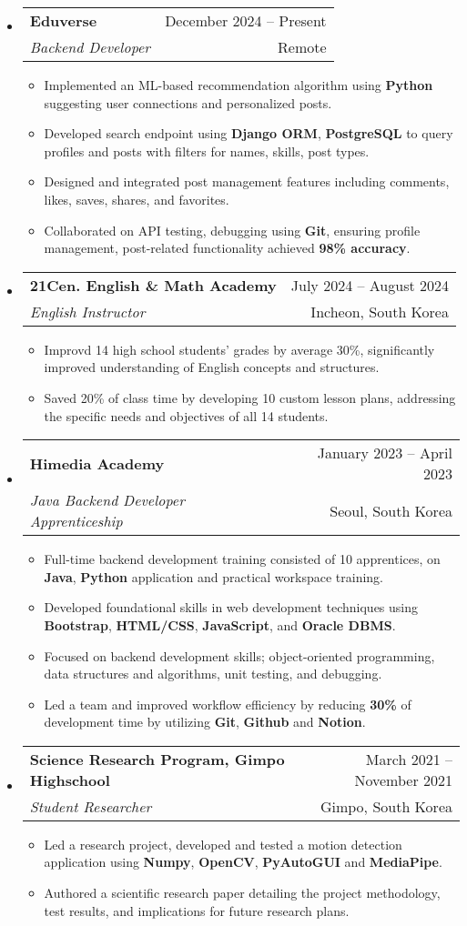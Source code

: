 \documentclass[letterpaper,11pt]{article}
\makeatletter
\newcommand{\resumeItem}[1]{
  \item\small{
    {#1 \vspace{-3pt}}
  }
}
\newcommand{\resumeSubheading}[4]{
    \item
    \begin{tabular*}{0.97\textwidth}[t]{l@{\extracolsep{\fill}}r@{\hspace{-0.2in}}}
        \small{\textbf{#1}} & \small{#2} \\
        \textit{\small#3} & \small #4 \\
    \end{tabular*}\vspace{-5pt}
}
\newcommand{\resumeSubHeadingListStart}{\begin{itemize}[leftmargin=0.00in, rightmargin=-0.2in, label={}]}
\newcommand{\resumeSubHeadingListEnd}{\end{itemize}\vspace{-7pt}}
\newcommand{\resumeItemListStart}{\begin{itemize}[leftmargin=0.15in, rightmargin=0.15in]}
\newcommand{\resumeItemListEnd}{\end{itemize}\vspace{-7pt}}
\makeatother
\begin{document}
\resumeSubHeadingListStart
\resumeSubheading
{Eduverse}{December 2024 -- Present}
{Backend Developer}{Remote}
\resumeItemListStart
\resumeItem{Implemented an ML-based recommendation algorithm using \textbf{Python} suggesting user connections and personalized posts.}
\resumeItem{Developed search endpoint using \textbf{Django ORM}, \textbf{PostgreSQL} to query profiles and posts with filters for names, skills, post types.}
\resumeItem{Designed and integrated post management features including comments, likes, saves, shares, and favorites.}
\resumeItem{Collaborated on API testing, debugging using \textbf{Git}, ensuring profile management, post-related functionality achieved \textbf{98\% accuracy}.}
\resumeItemListEnd
\resumeSubHeadingListEnd

\resumeSubHeadingListStart
\resumeSubheading
{21Cen. English \& Math Academy}{July 2024 -- August 2024}
{English Instructor}{Incheon, South Korea}
\resumeItemListStart
\resumeItem{Improvd 14 high school students' grades by average 30\%, significantly improved understanding of English concepts and structures.}
\resumeItem{Saved 20\% of class time by developing 10 custom lesson plans, addressing the specific needs and objectives of all 14 students.}
\resumeItemListEnd
\resumeSubHeadingListEnd

\resumeSubHeadingListStart
\resumeSubheading
{Himedia Academy}{January 2023 -- April 2023}
{Java Backend Developer Apprenticeship}{Seoul, South Korea}
\resumeItemListStart
\resumeItem{Full-time backend development training consisted of 10 apprentices, on \textbf{Java}, \textbf{Python} application and practical workspace training.}
\resumeItem{Developed foundational skills in web development techniques using \textbf{Bootstrap}, \textbf{HTML/CSS}, \textbf{JavaScript}, and \textbf{Oracle DBMS}.}
\resumeItem{Focused on backend development skills; object-oriented programming, data structures and algorithms, unit testing, and debugging.}
\resumeItem{Led a team and improved workflow efficiency by reducing \textbf{30\%} of development time by utilizing \textbf{Git}, \textbf{Github} and \textbf{Notion}.}
\resumeItemListEnd
\resumeSubHeadingListEnd

\resumeSubHeadingListStart
\resumeSubheading
{Science Research Program, Gimpo Highschool}{March 2021 -- November 2021}
{Student Researcher}{Gimpo, South Korea}
\resumeItemListStart
\resumeItem{Led a research project, developed and tested a motion detection application using \textbf{Numpy}, \textbf{OpenCV}, \textbf{PyAutoGUI} and \textbf{MediaPipe}.}
\resumeItem{Authored a scientific research paper detailing the project methodology, test results, and implications for future research plans.}
\resumeItemListEnd
\resumeSubHeadingListEnd
\end{document}
